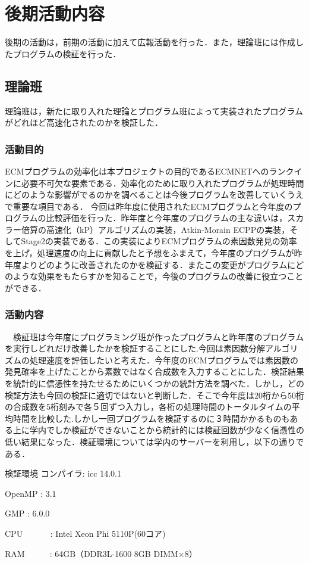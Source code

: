 \documentclass[openany,11pt,papersize]{jsbook}
\begin{document}
\chapter{後期活動内容}
後期の活動は，前期の活動に加えて広報活動を行った．また，理論班には作成したプログラムの検証を行った．

\section{理論班}
\label{sec:theoryresult}
理論班は，新たに取り入れた理論とプログラム班によって実装されたプログラムがどれほど高速化されたのかを検証した．

\subsection{活動目的}
ECMプログラムの効率化は本プロジェクトの目的であるECMNETへのランクインに必要不可欠な要素である．効率化のために取り入れたプログラムが処理時間にどのような影響がでるのかを調べることは今後プログラムを改善していくうえで重要な項目である．
今回は昨年度に使用されたECMプログラムと今年度のプログラムの比較評価を行った．昨年度と今年度のプログラムの主な違いは，スカラー倍算の高速化（kP）アルゴリズムの実装，Atkin-Morain ECPPの実装，そしてStage2の実装である．この実装によりECMプログラムの素因数発見の効率を上げ，処理速度の向上に貢献したと予想をふまえて，今年度のプログラムが昨年度よりどのように改善されたのかを検証する．またこの変更がプログラムにどのような効果をもたらすかを知ることで，今後のプログラムの改善に役立つことができる．

\subsection{活動内容}
　検証班は今年度にプログラミング班が作ったプログラムと昨年度のプログラムを実行しどれだけ改善したかを検証することにした.今回は素因数分解アルゴリズムの処理速度を評価したいと考えた．今年度のECMプログラムでは素因数の発見確率を上げたことから素数ではなく合成数を入力することにした．検証結果を統計的に信憑性を持たせるためにいくつかの統計方法を調べた．しかし，どの検証方法も今回の検証に適切ではないと判断した．そこで今年度は20桁から50桁の合成数を5桁刻みで各５回ずつ入力し，各桁の処理時間のトータルタイムの平均時間を比較した.しかし一回プログラムを検証するのに３時間かかるものもある上に学内でしか検証ができないことから統計的には検証回数が少なく信憑性の低い結果になった．検証環境については学内のサーバーを利用し，以下の通りである．
　
\begin{itembox}[l]{検証環境}
コンパイラ: icc 14.0.1

OpenMP   : 3.1

GMP       : 6.0.0

CPU　　　 : Intel Xeon Phi 5110P(60コア)

RAM　　　: 64GB（DDR3L-1600 8GB DIMM×8）

  \end{itembox}
\end{document}
